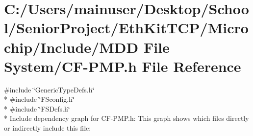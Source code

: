\hypertarget{_c_f-_p_m_p_8h}{}\section{C\+:/\+Users/mainuser/\+Desktop/\+School/\+Senior\+Project/\+Eth\+Kit\+T\+C\+P/\+Microchip/\+Include/\+M\+D\+D File System/\+C\+F-\/\+P\+M\+P.h File Reference}
\label{_c_f-_p_m_p_8h}
{\ttfamily \#include \char`\"{}Generic\+Type\+Defs.\+h\char`\"{}}\\*
{\ttfamily \#include \char`\"{}F\+Sconfig.\+h\char`\"{}}\\*
{\ttfamily \#include \char`\"{}F\+S\+Defs.\+h\char`\"{}}\\*
Include dependency graph for C\+F-\/\+P\+M\+P.h\+:
This graph shows which files directly or indirectly include this file\+:
